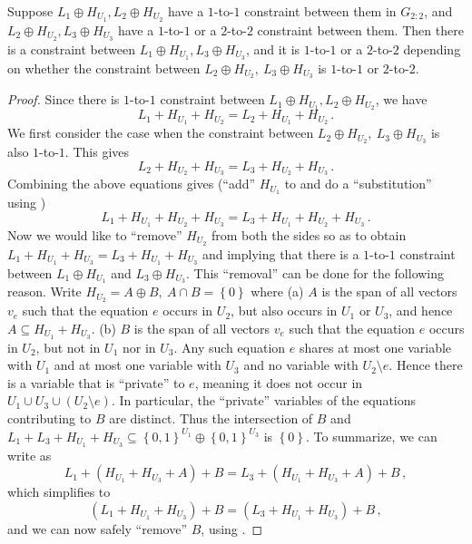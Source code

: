 \documentclass{toc}
\newcommand\set[1]{{\left\{ #1 \right\}}}
\newcommand\power[1]{\set{0,1}^{#1}}
\newcommand*\xor{\mathbin{\oplus}}
\begin{document}
\begin{lemma}\label{lemma:transitive}
Suppose $L_1\xor H_{U_1}, L_2\xor H_{U_2}$ have a $1$-to-$1$ constraint between them in $G_{2:2}$, and
$L_2\xor H_{U_2}, L_3\xor H_{U_3}$ have a $1$-to-$1$ or a $2$-to-$2$ constraint between them.
Then there is a constraint
between $L_1\xor H_{U_1}, L_3\xor H_{U_3}$, and it is  $1$-to-$1$ or a $2$-to-$2$ depending on whether
the constraint between $L_2\xor H_{U_2}, ~L_3\xor H_{U_3}$ is $1$-to-$1$ or $2$-to-$2$.
%
%
\end{lemma}
\begin{proof}
Since there is $1$-to-$1$ constraint between $L_1\xor H_{U_1}, L_2\xor H_{U_2}$, we have
\begin{equation} \label{eqn:tr-1}
L_1+ H_{U_1}+ H_{U_2} = L_2+ H_{U_1}+ H_{U_2}\,.%
\end{equation}
We first consider the case when the constraint between $L_2\xor H_{U_2}, ~L_3\xor H_{U_3}$ is also $1$-to-$1$. This gives
\begin{equation}\label{eqn:tr-2}
L_2+ H_{U_2}+ H_{U_3} = L_3+ H_{U_2}+ H_{U_3}\,.%
\end{equation}
Combining the above equations gives (``add'' $H_{U_1}$ to  and do a ``substitution'' using )
%
\begin{equation}\label{eqn:tr-4}
L_1 + H_{U_1} +  H_{U_2} + H_{U_3} = L_3 + H_{U_1} +  H_{U_2} + H_{U_3}\,.%
\end{equation}
Now we would like to ``remove'' $H_{U_2}$ from both the sides so as to obtain $L_1 + H_{U_1} +  H_{U_3} = L_3 + H_{U_1} +  H_{U_3}$ and
implying that there is a $1$-to-$1$ constraint between $L_1\xor H_{U_1}$ and $L_3\xor H_{U_3}$. This ``removal'' can be done for the following
reason. Write $H_{U_2} = A \xor B, ~A \cap B = \set{0}$ where (a) $A$ is the span of all vectors $v_e$ such that the equation $e$ occurs in $U_2$, but also occurs
 in $U_1$ or  $U_3$, and hence $A \subseteq H_{U_1} + H_{U_3}$. (b) $B$ is the span of all vectors $v_e$ such that the equation $e$ occurs
in $U_2$, but not in $U_1$ nor in $U_3$. Any such equation $e$ shares at most one variable with $U_1$ and at most one variable with $U_3$ and no
variable with $U_2 \setminus e$. Hence there is a variable that is ``private'' to $e$, meaning it does not occur in $U_1 \cup U_3 \cup (U_2 \setminus e)$.
In particular, the ``private'' variables of the equations contributing to $B$
are distinct. Thus the intersection of
$B$ and $L_1+ L_3+ H_{U_1}+ H_{U_3} \subseteq \power{U_1}\xor \power{U_3}$
is $\set{0}$. To summarize, we can write  as
\[
L_1 + \left( H_{U_1} + H_{U_3} +  A\right) + B  = L_3 + \left( H_{U_1} + H_{U_3} + A\right)  + B\,,%
\]
which simplifies to
\[
\left( L_1 + H_{U_1} + H_{U_3}\right)  + B  = \left( L_3 +  H_{U_1} + H_{U_3}\right)  + B\,,%
\]
and we can now safely ``remove'' $B$, using .


\end{proof}
\end{document}
